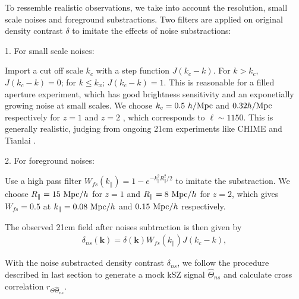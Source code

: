 To ressemble realistic observations, we take into account the resolution, small scale noises and foreground substractions. 
Two filters are applied on original density contrast $\delta$ to imitate the effects of noise substractions:

1. For small scale noises:

Import a cut off scale $k_c$ 
with a step function $J(k_c-k)$. 
For $k>k_c$, $J(k_c-k)=0$; for $k\leqslant k_x$; $J(k_c-k)=1$.
This is reasonable for a filled aperture experiment, which
has good brightness sensitivity and an exponetially growing noise at small 
scales.
We choose $k_c=0.5\ h/\mathrm{Mpc}$ and $0.32 h/\mathrm{Mpc}$ respectively for $z=1$ and $z=2$ , which corresponds
to $\ell\sim1150$. 
This is generally realistic, judging from ongoing 21cm experiments like
CHIME \cite{2014SPIE.9145E..22B}\cite{2014SPIE.9145E..4VN}
and Tianlai \cite{2012IJMPS..12..256C}\cite{2015ApJ...798...40X}.

2. For foreground noises:

Use a high pass filter $W_{fs}(k_\parallel)=1-e^{-k_\parallel^2R_\parallel^2/2}$ to imitate the substraction. 
We choose 
$R_\parallel=15\ \mathrm{Mpc}/h$ for $z=1$ and $R_\parallel=8\ \mathrm{Mpc}/h$ for $z=2$, which gives
$W_{fs}=0.5$ at
$k_\parallel=0.08\ \mathrm{Mpc}/h$ and $0.15\ \mathrm{Mpc}/h$ respectively. 

The observed 21cm field after noises subtraction is then given by 
\begin{eqnarray}
\label{eq:ns}
\delta_{ns}(\bm{k})=\delta(\bm{k})W_{fs}(k_\parallel)J(k_c-k),
\end{eqnarray}

With the noise substracted density contrast $\delta_{ns}$, we follow the procedure described in last section to generate a mock kSZ signal $\hat \Theta_{ns}$  
and calculate cross correlation $r_{\Theta\hat\Theta_{ns}}$.
